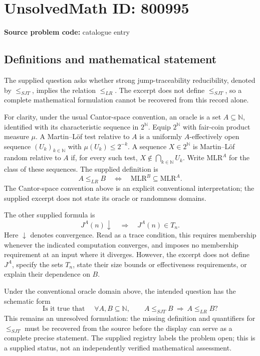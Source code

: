 \documentclass[11pt]{article}
\newcommand{\N}{\mathbb{N}}
\begin{document}
\section*{UnsolvedMath ID: 800995}
\textbf{Source problem code:} catalogue entry
\subsection{Definitions and mathematical statement}
The supplied question asks whether strong jump-traceability reducibility, denoted by \(\le_{SJT}\), implies the relation \(\le_{LR}\). The excerpt does not define \(\le_{SJT}\), so a complete mathematical formulation cannot be recovered from this record alone.

For clarity, under the usual Cantor-space convention, an oracle is a set \(A\subseteq\N\), identified with its characteristic sequence in \(2^{\N}\). Equip \(2^{\N}\) with fair-coin product measure \(\mu\). A Martin--L\"of test relative to \(A\) is a uniformly \(A\)-effectively open sequence \((U_k)_{k\in\N}\) with \(\mu(U_k)\leq 2^{-k}\). A sequence \(X\in 2^{\N}\) is Martin--L\"of random relative to \(A\) if, for every such test, \(X\notin\bigcap_{k\in\N}U_k\). Write \(\mathrm{MLR}^{A}\) for the class of these sequences. The supplied definition is
\[
A\le_{LR}B\quad\Longleftrightarrow\quad
\mathrm{MLR}^{B}\subseteq\mathrm{MLR}^{A}.
\]
The Cantor-space convention above is an explicit conventional interpretation; the supplied excerpt does not state its oracle or randomness domains.

The other supplied formula is
\[
J^{A}(n)\downarrow\quad\Longrightarrow\quad J^{A}(n)\in T_n.
\]
Here \(\downarrow\) denotes convergence. Read as a trace condition, this requires membership whenever the indicated computation converges, and imposes no membership requirement at an input where it diverges. However, the excerpt does not define \(J^{A}\), specify the sets \(T_n\), state their size bounds or effectiveness requirements, or explain their dependence on \(B\).

Under the conventional oracle domain above, the intended question has the schematic form
\[
\text{Is it true that }\quad
\forall A,B\subseteq\N,\qquad
A\le_{SJT}B\ \Longrightarrow\ A\le_{LR}B?
\]
This remains an unresolved formulation: the missing definition and quantifiers for \(\le_{SJT}\) must be recovered from the source before the display can serve as a complete precise statement. The supplied registry labels the problem open; this is a supplied status, not an independently verified mathematical assessment.
\end{document}

